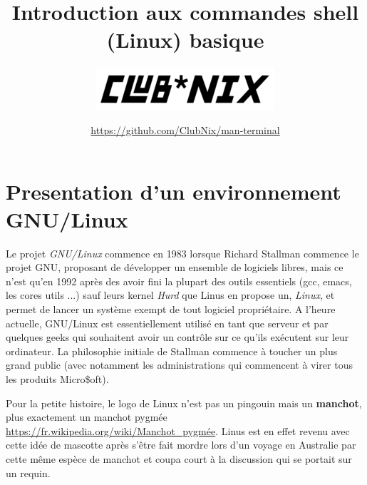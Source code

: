 \documentclass[french, a4paper, 12pt, titlepage]{article}
\begin{document}
\title{Introduction aux commandes shell (Linux) basique}
\author{\includegraphics[scale=0.7]{clubnix}}
\date{\url{https://github.com/ClubNix/man-terminal}}

\maketitle

\vfill
\pagebreak

\newpage
\strut\thispagestyle{empty}
\vfill
\pagebreak
\tableofcontents
\strut\thispagestyle{empty}
\newpage
\setcounter{page}{1}

\section{Presentation d'un environnement GNU/Linux}
Le projet \textit{GNU/Linux} commence en 1983 lorsque Richard Stallman commence le projet GNU, proposant de développer un ensemble de logiciels libres, mais ce n'est qu'en 1992 après des avoir fini la plupart des outils essentiels (gcc, emacs, les cores utils ...) sauf leurs kernel \textit{Hurd} que Linus en propose un, \textit{Linux}, et permet de lancer un système exempt de tout logiciel propriétaire.
A l'heure actuelle, GNU/Linux est essentiellement utilisé en tant que serveur et par quelques geeks qui souhaitent avoir un contrôle sur ce qu'ils exécutent sur leur ordinateur. La philosophie initiale de Stallman commence à toucher un plus grand public (avec notamment les administrations qui commencent à virer tous les produits Micro\$oft).

Pour la petite histoire, le logo de Linux n'est pas un pingouin mais un \textbf{manchot}, plus exactement un manchot pygmée \url{https://fr.wikipedia.org/wiki/Manchot_pygmée}. Linus est en effet revenu avec cette idée de mascotte après s'être fait mordre lors d'un voyage en Australie par cette même espèce de manchot et coupa court à la discussion qui se portait sur un requin.
\end{document}
